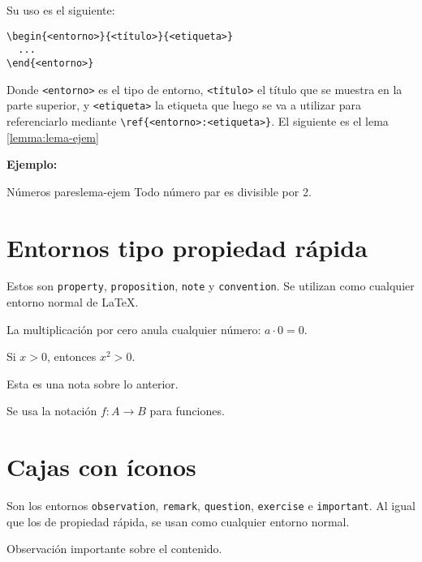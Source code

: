 \documentclass{simplenotes}
\begin{document}
Su uso es el siguiente:
\begin{verbatim}
\begin{<entorno>}{<título>}{<etiqueta>}
  ...
\end{<entorno>}
\end{verbatim}
Donde \texttt{<entorno>} es el tipo de entorno, \texttt{<título>} el título que se muestra en la parte superior, y \texttt{<etiqueta>} la etiqueta que luego se va a utilizar para referenciarlo mediante \verb|\ref{<entorno>:<etiqueta>}|. El siguiente es el lema \ref{lemma:lema-ejem}
\noindent

\textbf{Ejemplo:}
\begin{lemma}{Números pares}{lema-ejem}
Todo número par es divisible por 2.
\end{lemma}




\section{Entornos tipo propiedad rápida}
\noindent
Estos son \texttt{property}, \texttt{proposition}, \texttt{note} y \texttt{convention}. Se utilizan como cualquier entorno normal de \LaTeX.
\begin{property}
La multiplicación por cero anula cualquier número: $a\cdot 0 = 0$.
\end{property}

\begin{proposition}
Si $x > 0$, entonces $x^2 > 0$.
\end{proposition}

\begin{note}
Esta es una nota sobre lo anterior.
\end{note}

\begin{convention}
Se usa la notación $f: A \to B$ para funciones.
\end{convention}




\section{Cajas con íconos}
\noindent
Son los entornos \texttt{observation}, \texttt{remark}, \texttt{question}, \texttt{exercise} e \texttt{important}. Al igual que los de propiedad rápida, se usan como cualquier entorno normal.


\begin{observation}
Observación importante sobre el contenido.
\end{observation}
\end{document}

